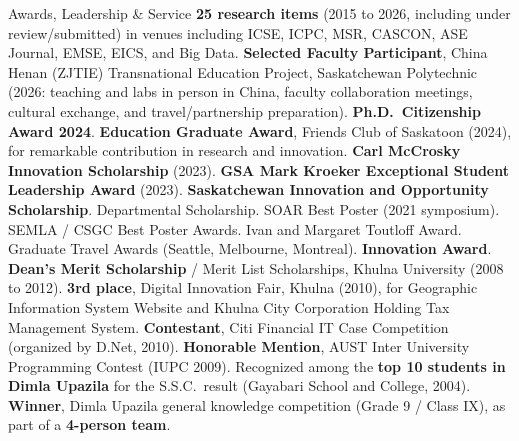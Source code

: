 \begin{rubric}{Awards, Leadership \& Service}
\entry*[Pubs]%
	\textbf{25 research items} (2015 to 2026, including under review/submitted) in venues including ICSE, ICPC, MSR, CASCON, ASE Journal, EMSE, EICS, and Big Data.
\vspace{-1mm}
\entry*[2023/26]%
	\textbf{Selected Faculty Participant}, China Henan (ZJTIE) Transnational Education Project, Saskatchewan Polytechnic (2026: teaching and labs in person in China, faculty collaboration meetings, cultural exchange, and travel/partnership preparation). \textbf{Ph.D.\ Citizenship Award 2024}. \textbf{Education Graduate Award}, Friends Club of Saskatoon (2024), for remarkable contribution in research and innovation. \textbf{Carl McCrosky Innovation Scholarship} (2023). \textbf{GSA Mark Kroeker Exceptional Student Leadership Award} (2023).
\vspace{-1mm}
\entry*[2017/24]%
	\textbf{Saskatchewan Innovation and Opportunity Scholarship}. Departmental Scholarship. SOAR Best Poster (2021 symposium). SEMLA / CSGC Best Poster Awards. Ivan and Margaret Toutloff Award. Graduate Travel Awards (Seattle, Melbourne, Montreal).
\vspace{-1mm}
\entry*[2008/12]%
	\textbf{Innovation Award}. \textbf{Dean's Merit Scholarship} / Merit List Scholarships, Khulna University (2008 to 2012). \textbf{3rd place}, Digital Innovation Fair, Khulna (2010), for Geographic Information System Website and Khulna City Corporation Holding Tax Management System. \textbf{Contestant}, Citi Financial IT Case Competition (organized by D.Net, 2010). \textbf{Honorable Mention}, AUST Inter University Programming Contest ({IUPC} 2009).
\vspace{-1mm}
\entry*[2002/04]%
	Recognized among the \textbf{top 10 students in Dimla Upazila} for the S.S.C.\ result (Gayabari School and College, 2004). \textbf{Winner}, Dimla Upazila general knowledge competition (Grade 9 / Class IX), as part of a \textbf{4-person team}.
\vspace{-1mm}
\entry*[Service]%

\end{rubric}
